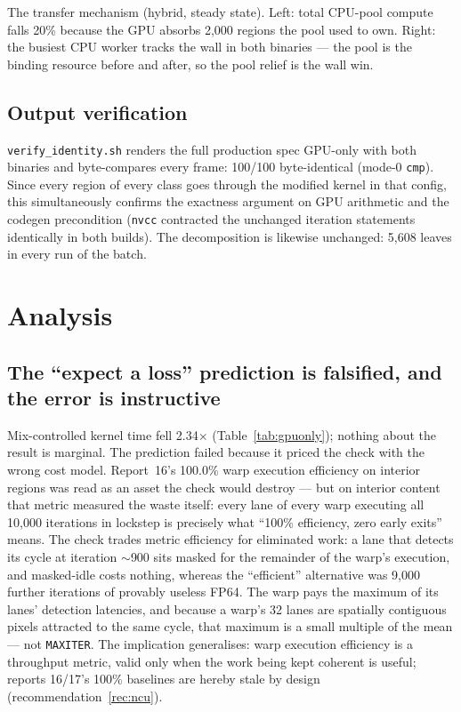 \documentclass[
	english,
	letterpaper, oneside
]{article}
\begin{document}
            {The transfer mechanism (hybrid, steady state). Left: total
             CPU-pool compute falls 20\% because the GPU absorbs 2{,}000
             regions the pool used to own. Right: the busiest CPU worker
             tracks the wall in both binaries --- the pool is the binding
             resource before and after, so the pool relief is the
             wall win. \label{fig:pool}}

\subsection{Output verification}
\label{sec:identity}

\texttt{verify\_identity.sh} renders the full production spec GPU-only with
both binaries and byte-compares every frame: 100/100 byte-identical
(mode-0 \texttt{cmp}). Since every region of every class goes through the
modified kernel in that config, this simultaneously confirms the exactness
argument on GPU arithmetic and the codegen precondition (\texttt{nvcc}
contracted the unchanged iteration statements identically in both builds).
The decomposition is likewise unchanged: 5{,}608 leaves in every run of the
batch.

\section{Analysis}
\label{sec:analysis}

\subsection{The ``expect a loss'' prediction is falsified, and the error is
instructive}

Mix-controlled kernel time fell 2.34$\times$ (Table~\ref{tab:gpuonly});
nothing about the result is marginal. The prediction failed because it
priced the check with the wrong cost model. Report~16's 100.0\% warp
execution efficiency on interior regions was read as an asset the check
would destroy --- but on interior content that metric measured the
waste itself: every lane of every warp executing all 10{,}000 iterations
in lockstep is precisely what ``100\% efficiency, zero early exits'' means.
The check trades metric efficiency for eliminated work: a lane that detects
its cycle at iteration $\sim$900 sits masked for the remainder of the warp's
execution, and masked-idle costs nothing, whereas the ``efficient''
alternative was 9{,}000 further iterations of provably useless FP64. The
warp pays the maximum of its lanes' detection latencies, and because a
warp's 32 lanes are spatially contiguous pixels attracted to the same cycle,
that maximum is a small multiple of the mean --- not \texttt{MAXITER}. The
implication generalises: warp execution efficiency is a throughput metric,
valid only when the work being kept coherent is useful; reports
16/17's 100\% baselines are hereby stale by design
(recommendation~\ref{rec:ncu}).
\end{document}
